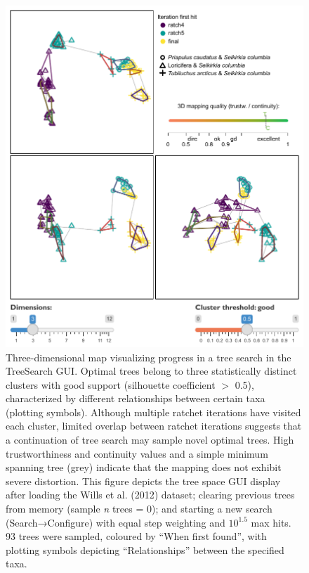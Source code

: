 \begin{figure}
\includegraphics[width=1\linewidth]{TreeSpace} \caption{Three-dimensional map visualizing progress in a tree search in the TreeSearch GUI. Optimal trees belong to three statistically distinct clusters with good support (silhouette coefficient \(>\) 0.5), characterized by different relationships between certain taxa (plotting symbols). Although multiple ratchet iterations have visited each cluster, limited overlap between ratchet iterations suggests that a continuation of tree search may sample novel optimal trees. High trustworthiness and continuity values and a simple minimum spanning tree (grey) indicate that the mapping does not exhibit severe distortion. This figure depicts the tree space GUI display after loading the Wills et al. (2012) dataset; clearing previous trees from memory (sample \emph{n} trees = 0); and starting a new search (Search→Configure) with equal step weighting and \(10^{1.5}\) max hits. 93 trees were sampled, coloured by ``When first found'', with plotting symbols depicting ``Relationships'' between the specified taxa.}\label{fig:treespace-latex}
\end{figure}



